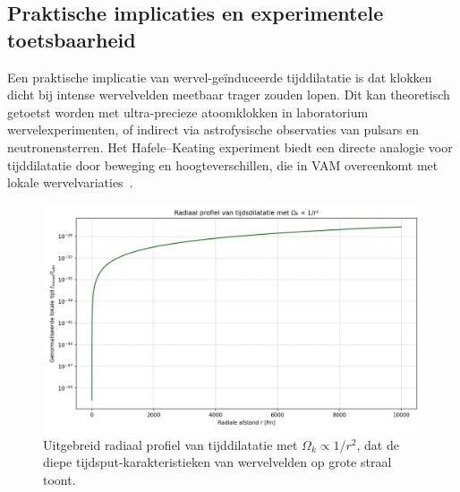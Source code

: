 \subsection{Praktische implicaties en experimentele toetsbaarheid}

Een praktische implicatie van wervel-geïnduceerde tijddilatatie is dat klokken dicht bij intense wervelvelden meetbaar trager zouden lopen. Dit kan theoretisch getoetst worden met ultra-precieze atoomklokken in laboratorium wervelexperimenten, of indirect via astrofysische observaties van pulsars en neutronensterren. Het Hafele–Keating experiment biedt een directe analogie voor tijddilatatie door beweging en hoogteverschillen, die in VAM overeenkomt met lokale wervelvariaties~\cite{hafele1972around}.

\begin{figure}[ht!]
    \centering
    \includegraphics[width=0.7\linewidth]{images/05-LogarithmicDecayLocalTime_nl}
    \caption{Uitgebreid radiaal profiel van tijddilatatie met $\Omega_k \propto 1/r^2$, dat de diepe tijdsput-karakteristieken van wervelvelden op grote straal toont.}
    \label{fig:NewGraph}
\end{figure}